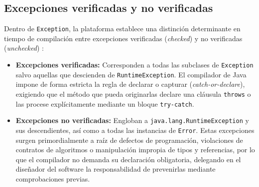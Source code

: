 \documentclass[letterpaper,12pt,oneside]{article}
\numberwithin{figure}{section}
\begin{document}
\subsection{Excepciones verificadas y no verificadas}
Dentro de \texttt{Exception}, la plataforma establece una distinción determinante en tiempo de compilación entre excepciones verificadas (\textit{checked}) y no verificadas (\textit{unchecked}) \cite{oracleexceptions}:
\begin{itemize}
  \item \textbf{Excepciones verificadas:} Corresponden a todas las subclases de \texttt{Exception} salvo aquellas que descienden de \texttt{RuntimeException}. El compilador de Java impone de forma estricta la regla de declarar o capturar (\textit{catch-or-declare}), exigiendo que el método que pueda originarlas declare una cláusula \texttt{throws} o las procese explícitamente mediante un bloque \texttt{try-catch}.
  \item \textbf{Excepciones no verificadas:} Engloban a \texttt{java.lang.RuntimeException} y sus descendientes, así como a todas las instancias de \texttt{Error}. Estas excepciones surgen primordialmente a raíz de defectos de programación, violaciones de contratos de algoritmos o manipulación impropia de tipos y referencias, por lo que el compilador no demanda su declaración obligatoria, delegando en el diseñador del software la responsabilidad de prevenirlas mediante comprobaciones previas.
\end{itemize}
\end{document}
